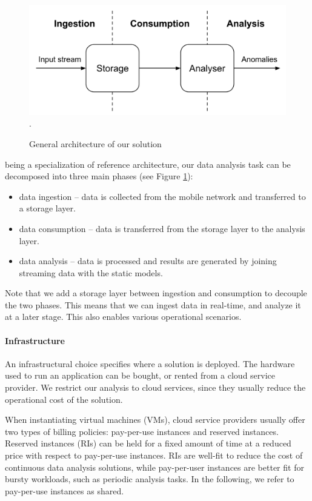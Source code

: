 {\begin{figure}[ht]
  \centering
  \includegraphics[width=.7\textwidth]{img/eval-arch-1}.
    \caption{General architecture of our solution}
    \label{fig:arch_abs}
\end{figure}

being a specialization of \river{} reference architecture, our data analysis task can be decomposed into three main phases (see Figure \ref{fig:arch_abs}):
\begin{itemize}
\item data ingestion -- data is collected from the mobile network and transferred to a storage layer.
\item data consumption -- data is transferred from the storage layer to the analysis layer.
\item data analysis -- data is processed and results are generated by joining streaming data with the static models.
\end{itemize}

Note that we add a storage layer between ingestion and consumption to decouple the two phases. This means that we can ingest data in real-time, and analyze it at a later stage. This also enables various operational scenarios.
\paragraph{Infrastructure}
An infrastructural choice specifies where a solution is deployed. The hardware used to run an application can be bought, or rented from a cloud service provider. We restrict our analysis to cloud services, since they usually reduce the operational cost of the solution.

When instantiating virtual machines (VMs), cloud service providers usually offer two types of billing policies: pay-per-use instances and reserved instances. Reserved instances (RIs) can be held for a fixed amount of time at a reduced price with respect to pay-per-use instances. RIs are well-fit to reduce the cost of continuous data analysis solutions, while pay-per-user instances are better fit for bursty workloads, such as periodic analysis tasks. In the following, we refer to pay-per-use instances as shared.

}
